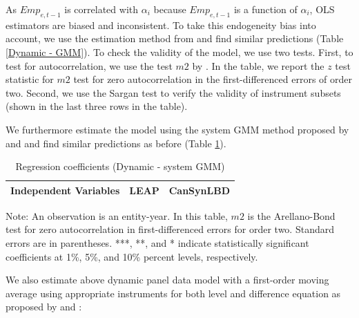 As $Emp_{e,t-1}$ is correlated with $\alpha_{i}$ because $Emp_{e,t-1}$ is a function of $\alpha_{i}$, 
OLS estimators are biased and inconsistent. 
To take this endogeneity bias into account, we use the estimation method from \textcite{RePEc:oup:restud:v:58:y:1991:i:2:p:277-297.} and find similar predictions (Table \ref{Dynamic - GMM}). To check the validity of the model, we use two tests. First, to test for autocorrelation, we use the test $m2$ by \textcite{RePEc:oup:restud:v:58:y:1991:i:2:p:277-297.}. In the table, we report the $z$ test statistic for $m2$ test for zero autocorrelation in the  first-differenced errors of order two. Second, we use the Sargan test to verify the validity of instrument subsets (shown in the last three rows in the table).

We furthermore estimate the model using the system GMM  method proposed by \textcite{RePEc:eee:econom:v:68:y:1995:i:1:p:29-51} and \textcite{RePEc:eee:econom:v:87:y:1998:i:1:p:115-143} and find similar predictions as before (Table \ref{Dynamic - system GMM}). 

\begin{table}[H]
  \centering
\begin{threeparttable}
 \caption{Regression coefficients (Dynamic - system GMM)} \label{Dynamic - system GMM} \medskip
\renewcommand{\arraystretch}{1}
\begin{tabular}{l|c c| c c}
\toprule
\textbf{Independent Variables}&\multicolumn{2}{c|}{\textbf{LEAP}} &  \multicolumn{2}{c}{\textbf{CanSynLBD}}\\
\midrule

   \bottomrule
  \end{tabular} 
\begin{tablenotes}
\small
\item Note: An observation is an entity-year. In this table, $m2$ is the Arellano-Bond test for zero autocorrelation in first-differenced errors for order two. Standard errors are in parentheses. ***, **, and * indicate statistically significant coefficients at 1\%, 5\%, and 10\% percent levels, respectively.
 \end{tablenotes}
 \end{threeparttable}
\end{table}

We also estimate above dynamic panel data model with a first-order moving average using appropriate instruments for both level and difference equation as proposed by \textcite{RePEc:eee:econom:v:68:y:1995:i:1:p:29-51} and \textcite{RePEc:eee:econom:v:87:y:1998:i:1:p:115-143}:

